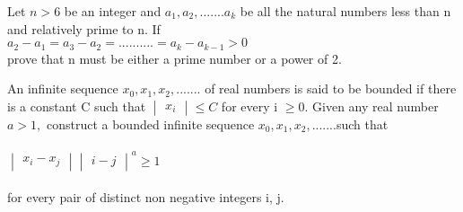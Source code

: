 \item Let $n > 6$ be an integer and $a_1, a_2,....... a_k$ be all the natural numbers less than n and relatively prime to n. If\\
$a_2 - a_1 = a_3 - a_2 =..........= a_k - a_{k-1} > 0$
\\prove that n must be either a prime number or a power of 2.\\

\item An infinite sequence $x_0, x_1, x_2,$....... of real numbers is said to be bounded
if there is a constant C such that $\begin{vmatrix} x_i \end{vmatrix} \leq C$ for every i $\geq 0.$ Given any real number $a > 1,$ construct a bounded infinite sequence $x_0, x_1, x_2,$.......such that\\
\\ $\begin{vmatrix} x_i - x_j \end{vmatrix} \begin{vmatrix} i - j \end{vmatrix}^a \geq 1$\\
\\for every pair of distinct non negative integers i, j.\\


